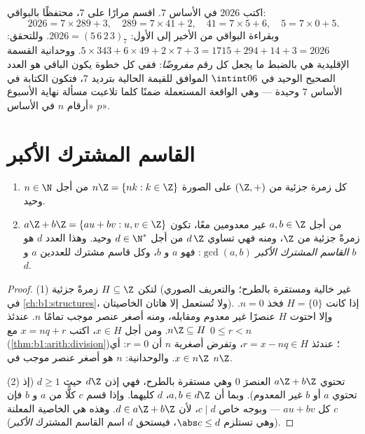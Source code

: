 \begin{example}\label{ex:b1:arith:base7}
اكتب $2026$ في الأساس $7$. اقسم مرارًا على $7$، محتفظًا
بالبواقي:
\[
2026 = 7 \times 289 + 3, \quad
289 = 7 \times 41 + 2, \quad
41 = 7 \times 5 + 6, \quad
5 = 7 \times 0 + 5 .
\]
وبقراءة البواقي من الأخير إلى الأول: $2026 =
(5\,6\,2\,3)_7$. وللتحقق: $5 \times 343 + 6 \times 49 + 2 \times 7
+ 3 = 1715 + 294 + 14 + 3 = 2026$. ووحدانية القسمة
الإقليدية هي بالضبط ما يجعل كل رقم \emph{مفروضًا}: ففي كل
خطوة يكون الباقي هو العدد الصحيح الوحيد في $\intint06$ الموافق
للقيمة الحالية بترديد $7$، فتكون الكتابة في الأساس $7$ وحيدة ---
وهي الواقعة المستعملة ضمنًا كلما تلاعبت مسألة نهاية الأسبوع  «أرقام $n$ في الأساس $p$».
\end{example}

\section{القاسم المشترك الأكبر}

\begin{theorem}\label{thm:b1:arith:gcd}
\begin{enumerate}
  \item كل زمرة جزئية من $(\Z, +)$ على الصورة $n\Z = \{nk : k
        \in \Z\}$ من أجل $n \in \N$ وحيد.
  \item من أجل $a, b \in \Z$ غير معدومين معًا، تكون  $a\Z + b\Z = \{au +
        bv : u, v \in \Z\}$ زمرةً جزئية من $\Z$، ومنه فهي تساوي
        $d\,\Z$ من أجل $d \in \N^*$ وحيد. وهذا العدد $d$ هو
        \emph{القاسم المشترك الأكبر}
        $\gcd(a, b)$: فهو  $a$ و $b$، وكل قاسم مشترك
        للعددين $a$ و $b$  $d$.
\end{enumerate}
\end{theorem}

\begin{proof}
(1) لتكن $H \subseteq \Z$ زمرةً جزئية (غير خالية ومستقرة
بالطرح؛ والتعريف الصوري في \cref{ch:b1:structures}،
ولا تُستعمل إلا هاتان الخاصيتان). إذا كانت $H = \{0\}$ فخذ $n = 0$.
وإلا احتوت $H$ عنصرًا غير معدوم ومقابله، ومنه
أصغر عنصر موجب تمامًا $n$. عندئذ $n\Z \subseteq H$. ومن أجل $x
\in H$، اكتب $x = nq + r$ مع $0 \leq r < n$
(\cref{thm:b1:arith:division})؛ عندئذ $r = x - nq \in H$، وتفرض أصغرية
$n$ أن $r = 0$: أي $x \in n\Z$. والوحدانية: $n$ هو أصغر عنصر موجب
في $n\Z$.

(2) تحتوي $a\Z + b\Z$ العنصرَ $0$ وهي مستقرة بالطرح، فهي إذن
$d\Z$ حيث $d \geq 1$ (إذ تحتوي $a$ أو $b$ غير المعدوم). وبما أن $a, b
\in d\Z$،  $d$ كليهما. وإذا قسم $c$ كلًّا من $a$ و $b$ فإن $c$
 كل $au + bv$ --- وبوجه خاص $c \mid d$، لأن $d \in a\Z
+ b\Z$. وهذه هي الخاصية المعلنة (وهي تستلزم $\abs c \leq
d$، فيستحق $d$ اسم القاسم المشترك \emph{الأكبر}).
\end{proof}

